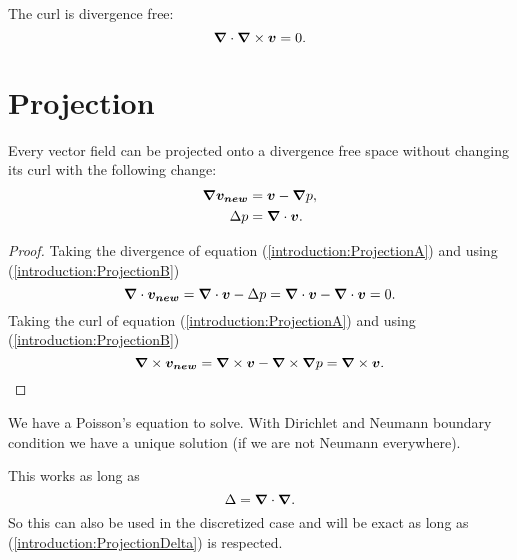 \begin{property}
The curl is divergence free:
 \begin{equation}
  {\boldsymbol {\nabla}}\cdot {\boldsymbol {\nabla}} \times {\boldsymbol {v}}=0.
 \end{equation}
\end{property}

\section{Projection}
\label{introduction:projection}
\begin{property}
 Every vector field can be projected onto a divergence free space without changing its curl with the following change:
\begin{align}
 {\boldsymbol {\nabla}}{\boldsymbol {v_{new}}}&={\boldsymbol {v}}-{\boldsymbol {\nabla}}p \label{introduction:ProjectionA},\\
 \Delta p&={\boldsymbol {\nabla}} \cdot {\boldsymbol {v}} \label{introduction:ProjectionB}.
\end{align}
\end{property}
\begin{proof}
  Taking the divergence of equation (\ref{introduction:ProjectionA}) and using (\ref{introduction:ProjectionB})
  \begin{equation}
   {\boldsymbol {\nabla}}\cdot{\boldsymbol {v_{new}}}={\boldsymbol {\nabla}}\cdot{\boldsymbol {v}}-\Delta p={\boldsymbol {\nabla}}\cdot{\boldsymbol {v}}-{\boldsymbol {\nabla}}\cdot{\boldsymbol {v}}=0.
  \end{equation}
  Taking the curl of equation (\ref{introduction:ProjectionA}) and using (\ref{introduction:ProjectionB})
  \begin{equation}
   {\boldsymbol {\nabla}}\times{\boldsymbol {v_{new}}}={\boldsymbol {\nabla}}\times{\boldsymbol {v}}-{\boldsymbol {\nabla}}\times{\boldsymbol {\nabla}} p={\boldsymbol {\nabla}}\times{\boldsymbol {v}}.
  \end{equation}
  \end{proof}
  
   \begin{remark}
    We have a Poisson's equation to solve. With Dirichlet and Neumann boundary condition we have a unique solution (if we are not
    Neumann everywhere).	
   \end{remark}

  
  \begin{remark}
 This works as long as
 \begin{equation}
  \Delta={\boldsymbol {\nabla}}\cdot {\boldsymbol {\nabla}}.\label{introduction:ProjectionDelta}
 \end{equation}
 So this can also be used in the discretized case and will be exact as long as (\ref{introduction:ProjectionDelta}) is respected.
 \end{remark}


